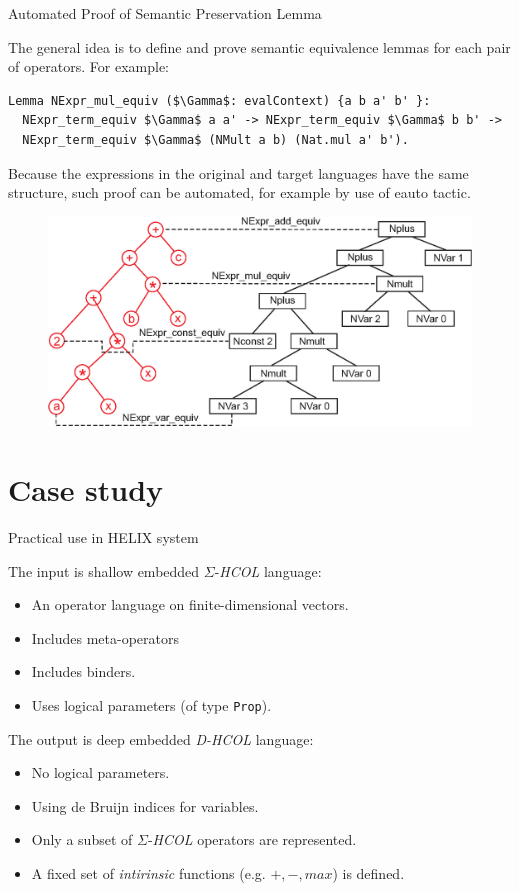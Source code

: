 \documentclass[aspectratio=169]{beamer}
\newcommand{\SHCOL}{\texorpdfstring{$\Sigma$-\emph{HCOL}}{Sigma-HCOL}}
\newcommand{\DHCOL}{\emph{D-HCOL}}
\begin{document}
\begin{frame}[fragile]{Automated Proof of Semantic Preservation Lemma}

  The general idea is to define and prove semantic
  equivalence lemmas for each pair of operators. For example:

  \begin{lstlisting}[language=Coq, mathescape=true,frame=single, basicstyle=\footnotesize]
Lemma NExpr_mul_equiv ($\Gamma$: evalContext) {a b a' b' }:
  NExpr_term_equiv $\Gamma$ a a' -> NExpr_term_equiv $\Gamma$ b b' ->
  NExpr_term_equiv $\Gamma$ (NMult a b) (Nat.mul a' b').
\end{lstlisting}

Because the expressions in the original and target languages have the
same structure, such proof can be automated, for example by use of
{eauto} tactic.
  
  \begin{figure}[h]
    \includegraphics[width=0.5\columnwidth]{figures/trees.eps}
  \end{figure}

\end{frame}


\section{Case study}

\begin{frame}{Practical use in HELIX system}

  The input is shallow embedded {\SHCOL} language:
  \begin{itemize}
  \item An operator language on finite-dimensional vectors.
  \item Includes meta-operators
  \item Includes binders.
  \item Uses logical parameters (of type \lstinline[language=Coq]{Prop}).
  \end{itemize}
  \medskip
  The output is deep embedded {\DHCOL} language:
  \begin{itemize}
  \item No logical parameters.
  \item Using de Bruijn indices for variables.
  \item Only a subset of {\SHCOL} operators are represented.
  \item A fixed set of \textit{intirinsic} functions (e.g. $+,-,max$) is defined.
  \end{itemize}
  
\end{frame}
\end{document}
